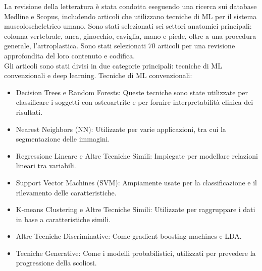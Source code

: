La revisione della letteratura è stata condotta eseguendo una ricerca sui database Medline e Scopus, includendo articoli che utilizzano tecniche di ML per il sistema muscoloscheletrico umano. Sono stati selezionati sei settori anatomici principali: colonna vertebrale, anca, ginocchio, caviglia, mano e piede, oltre a una procedura generale, l'artroplastica. Sono stati selezionati 70 articoli per una revisione approfondita del loro contenuto e codifica.\\
Gli articoli sono stati divisi in due categorie principali: tecniche di ML convenzionali e deep learning.
Tecniche di ML convenzionali:
\begin{itemize}
\item Decision Trees e Random Forests: Queste tecniche sono state utilizzate per classificare i soggetti con osteoartrite e per fornire interpretabilità clinica dei risultati.
\item Nearest Neighbors (NN): Utilizzate per varie applicazioni, tra cui la segmentazione delle immagini.
\item Regressione Lineare e Altre Tecniche Simili: Impiegate per modellare relazioni lineari tra variabili.
\item Support Vector Machines (SVM): Ampiamente usate per la classificazione e il rilevamento delle caratteristiche.
\item K-means Clustering e Altre Tecniche Simili: Utilizzate per raggruppare i dati in base a caratteristiche simili.
\item Altre Tecniche Discriminative: Come gradient boosting machines e LDA.
\item Tecniche Generative: Come i modelli probabilistici, utilizzati per prevedere la progressione della scoliosi.
\end{itemize}





